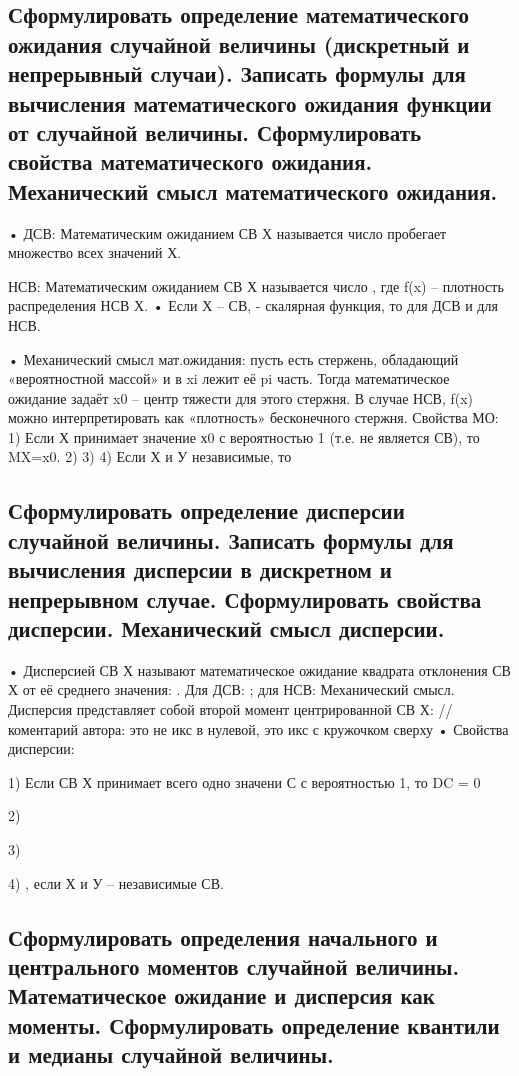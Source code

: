 \subsection{Сформулировать определение математического ожидания случайной величины (дискретный и непрерывный случаи). Записать формулы для вычисления математического ожидания функции от случайной величины. Сформулировать свойства математического ожидания. Механический смысл математического ожидания.}


• ДСВ: Математическим ожиданием СВ Х называется число  пробегает множество всех значений Х.

НСВ: Математическим ожиданием СВ Х называется число , где f(x) – плотность распределения НСВ Х.
• Если Х – СВ,  - скалярная функция, то  для ДСВ и  для НСВ.

• Механический смысл мат.ожидания: пусть есть стержень, обладающий «вероятностной массой» и в xi лежит её pi часть. Тогда математическое ожидание задаёт x0 – центр тяжести для этого стержня. В случае НСВ, f(x) можно интерпретировать как «плотность» бесконечного стержня.
Свойства МО:
1) Если Х принимает значение х0 с вероятностью 1 (т.е. не является СВ), то MX=x0.
2) 
3) 
4) Если Х и У независимые, то 

\subsection{Сформулировать определение дисперсии случайной величины. Записать формулы для вычисления дисперсии в дискретном и непрерывном случае. Сформулировать свойства дисперсии. Механический смысл дисперсии.}

• Дисперсией СВ Х называют математическое ожидание квадрата отклонения СВ Х от её среднего значения: .
Для ДСВ: ;    для НСВ: 
Механический смысл. Дисперсия представляет собой второй момент центрированной СВ Х:  //коментарий автора: это не икс в нулевой, это икс с кружочком сверху
• Свойства дисперсии:

1) Если СВ Х принимает всего одно значени С с вероятностью 1, то DC = 0

2) 

3) 

4) , если Х и У – независимые СВ.

\subsection{Сформулировать определения начального и центрального моментов случайной величины. Математическое ожидание и дисперсия как моменты. Сформулировать определение квантили и медианы случайной величины.}


